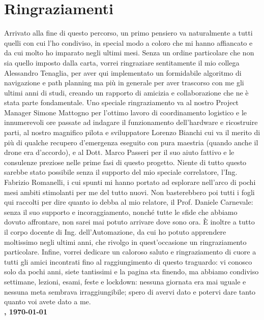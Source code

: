 
\fancyhf{}
\thispagestyle{plain}

\chapter{Ringraziamenti}
\fontsize{12}{12}\selectfont
\onehalfspacing
Arrivato alla fine di questo percorso, un primo pensiero va naturalmente a tutti quelli con cui l'ho condiviso, in special modo a coloro che mi hanno affiancato e da cui molto ho imparato negli ultimi mesi. Senza un ordine particolare che non sia quello imposto dalla carta, vorrei ringraziare sentitamente il mio collega Alessandro Tenaglia, per aver qui implementato un formidabile algoritmo di navigazione e path planning ma più in generale per aver trascorso con me gli ultimi anni di studi, creando un rapporto di amicizia e collaborazione che ne è stata parte fondamentale. Uno speciale ringraziamento va al nostro Project Manager Simone Mattogno per l'ottimo lavoro di coordinamento logistico e le innumerevoli ore passate ad indagare il funzionamento dell'hardware e ricostruire parti, al nostro magnifico pilota e sviluppatore Lorenzo Bianchi cui va il merito di più di qualche recupero d'emergenza eseguito con pura maestria (quando anche il drone era d'accordo), e al Dott. Marco Passeri per il suo aiuto fattivo e le consulenze preziose nelle prime fasi di questo progetto. Niente di tutto questo sarebbe stato possibile senza il supporto del mio speciale correlatore, l'Ing. Fabrizio Romanelli, i cui spunti mi hanno portato ad esplorare nell'arco di pochi mesi ambiti stimolanti per me del tutto nuovi. Non basterebbero poi tutti i fogli qui raccolti per dire quanto io debba al mio relatore, il Prof. Daniele Carnevale: senza il suo supporto e incoraggiamento, nonché tutte le sfide che abbiamo dovuto affrontare, non sarei mai potuto arrivare dove sono ora. È inoltre a tutto il corpo docente di Ing. dell'Automazione, da cui ho potuto apprendere moltissimo negli ultimi anni, che rivolgo in quest'occasione un ringraziamento particolare. Infine, vorrei dedicare un caloroso saluto e ringraziamento di cuore a tutti gli amici incontrati fino al raggiungimento di questo traguardo: vi conosco solo da pochi anni, siete tantissimi e la pagina sta finendo, ma abbiamo condiviso settimane, lezioni, esami, feste e lockdown: nessuna giornata era mai uguale e nessuna meta sembrava irraggiungibile; spero di avervi dato e potervi dare tanto quanto voi avete dato a me.\\
\hspace*{\fill}\textbf{\autore, \today}
